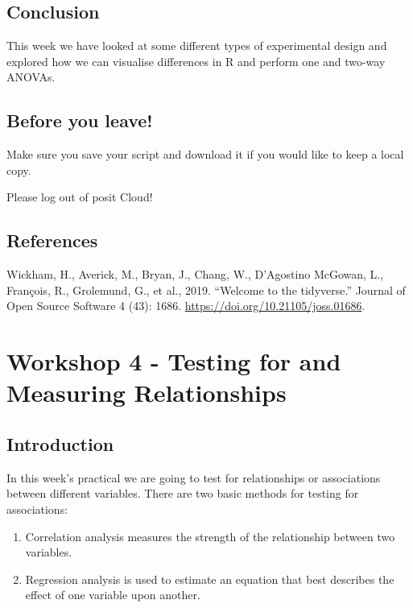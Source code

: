 \documentclass[
]{book}
\providecommand{\tightlist}{%
  \setlength{\itemsep}{0pt}\setlength{\parskip}{0pt}}
\begin{document}
\hypertarget{conclusion-2}{%
\section{Conclusion}\label{conclusion-2}}

This week we have looked at some different types of experimental design and explored how we can visualise differences in R and perform one and two-way ANOVAs.

\hypertarget{before-you-leave-4}{%
\section{Before you leave!}\label{before-you-leave-4}}

Make sure you save your script and download it if you would like to keep a local copy.

Please log out of posit Cloud!

\hypertarget{references-3}{%
\section{References}\label{references-3}}

Wickham, H., Averick, M., Bryan, J., Chang, W., D'Agostino McGowan, L., François, R., Grolemund, G., et al., 2019. ``Welcome to the tidyverse.'' Journal of Open Source Software 4 (43): 1686. \url{https://doi.org/10.21105/joss.01686}.

\hypertarget{workshop-4---testing-for-and-measuring-relationships}{%
\chapter{Workshop 4 - Testing for and Measuring Relationships}\label{workshop-4---testing-for-and-measuring-relationships}}

\hypertarget{introduction-3}{%
\section{Introduction}\label{introduction-3}}

In this week's practical we are going to test for relationships or associations between different variables. There are two basic methods for testing for associations:

\begin{enumerate}
\def\labelenumi{\arabic{enumi})}
\tightlist
\item
  Correlation analysis measures the strength of the relationship between two variables.
\item
  Regression analysis is used to estimate an equation that best describes the effect of one variable upon another.
\end{enumerate}
\end{document}
